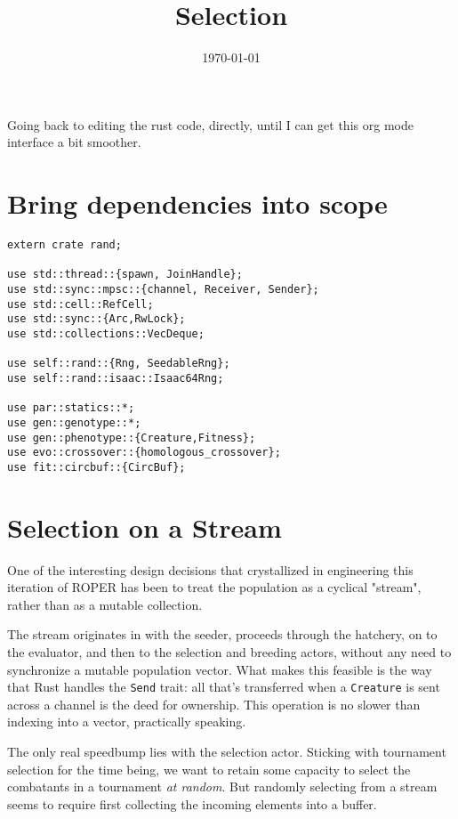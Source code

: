 \documentclass[11pt]{article}
\date{\today}
\title{Selection}
\begin{document}
\maketitle
\tableofcontents

Going back to editing the rust code, directly, until I can get
this org mode interface a bit smoother.

\section{Bring dependencies into scope}
\label{sec:org2f3a547}
\lstset{language=rust,label=orgf356fde,caption= ,captionpos=b,numbers=none}
\begin{lstlisting}
extern crate rand; 

use std::thread::{spawn, JoinHandle};
use std::sync::mpsc::{channel, Receiver, Sender};
use std::cell::RefCell;
use std::sync::{Arc,RwLock}; 
use std::collections::VecDeque;

use self::rand::{Rng, SeedableRng};
use self::rand::isaac::Isaac64Rng;

use par::statics::*;
use gen::genotype::*;
use gen::phenotype::{Creature,Fitness};
use evo::crossover::{homologous_crossover};
use fit::circbuf::{CircBuf};
\end{lstlisting}

\section{Selection on a Stream}
\label{sec:org37da787}

One of the interesting design decisions that crystallized in engineering
this iteration of ROPER has been to treat the population as a cyclical
"stream", rather than as a mutable collection. 

The stream originates in with the seeder, proceeds through the hatchery,
on to the evaluator, and then to the selection and breeding actors, without
any need to synchronize a mutable population vector. What makes this feasible
is the way that Rust handles the \texttt{Send} trait: all that's transferred when a
\texttt{Creature} is sent across a channel is the deed for ownership. This operation
is no slower than indexing into a vector, practically speaking. 

The only real speedbump lies with the selection actor. Sticking with tournament
selection for the time being, we want to retain some capacity to select the
combatants in a tournament \emph{at random}. But randomly selecting from a stream
seems to require first collecting the incoming elements into a buffer. 
\end{document}
